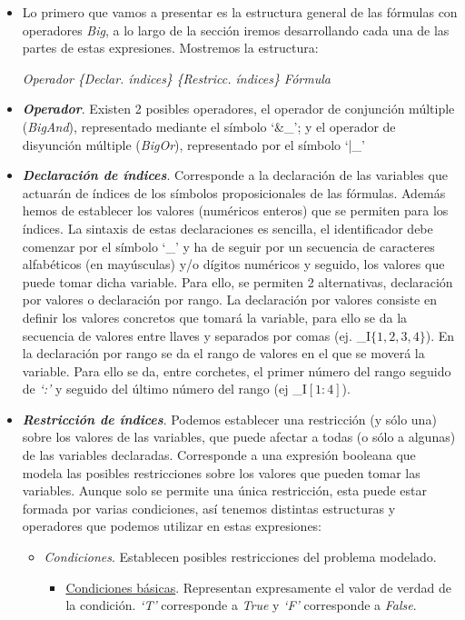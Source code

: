 \documentclass[a4paper]{report}
\begin{document}
\begin{itemize}
\item Lo primero que vamos a presentar es la estructura general de las fórmulas con operadores \textit{Big}, a lo largo de la sección iremos desarrollando cada una de las partes de estas expresiones. Mostremos la estructura:
\begin{center} \textit{Operador} \textit{\{Declar. índices\}} \textit{\{Restricc. índices\} }  \textit{Fórmula}\end{center} 

\item \textbf{\textit{Operador}}. Existen 2 posibles operadores, el operador de conjunción múltiple (\textit{BigAnd}), representado mediante el símbolo `\&\_'; y el operador de disyunción múltiple (\textit{BigOr}), representado por el símbolo `|\_'

\item \textbf{\textit{Declaración de índices}}. Corresponde a la declaración de las variables que actuarán de índices de los símbolos proposicionales de las fórmulas. Además hemos de establecer los valores (numéricos enteros) que se permiten para los índices. La sintaxis de estas declaraciones es sencilla, el identificador debe comenzar por el símbolo `\_' y ha de seguir por un secuencia de caracteres alfabéticos (en mayúsculas) y/o dígitos numéricos y seguido, los valores que puede tomar dicha variable. Para ello, se permiten 2 alternativas, declaración por valores o declaración por rango. La declaración por valores consiste en definir los valores concretos que tomará la variable, para ello se da la secuencia de valores entre llaves y separados por comas (ej. \_I$\{1,2,3,4\}$). En la declaración por rango se da el rango de valores en el que se moverá la variable. Para ello se da, entre corchetes, el primer número del rango seguido de \textit{`:'} y seguido del último número del rango (ej \_I$[1:4]$). 

\item \textbf{\textit{Restricción de índices}}. Podemos establecer una restricción (y sólo una) sobre los valores de las variables, que puede afectar a todas (o sólo a algunas) de las variables declaradas. Corresponde a una expresión booleana que modela las posibles restricciones sobre los valores que pueden tomar las variables. Aunque solo se permite una única restricción, esta puede estar formada por varias condiciones, así tenemos distintas estructuras y operadores que podemos utilizar en estas expresiones:

\begin{itemize}
\item \textit{Condiciones}. Establecen posibles restricciones del problema modelado.
\begin{itemize}
\item \underline{Condiciones básicas}. Representan expresamente el valor de verdad de la condición. \textit{`T'} corresponde a \textit{True} y \textit{`F'} corresponde a \textit{False}.


\end{itemize}
\end{itemize}
\end{itemize}
\end{document}
